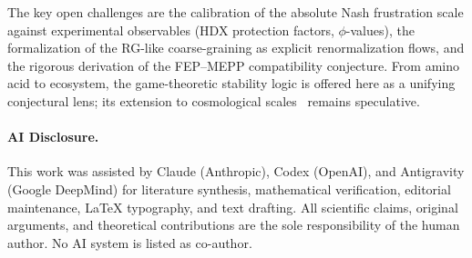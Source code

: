 \documentclass[12pt,a4paper]{article}
\theoremstyle{remark}
\begin{document}
The key open challenges are the calibration of the absolute Nash frustration scale against experimental observables (HDX protection factors, $\phi$-values), the formalization of the RG-like coarse-graining as explicit renormalization flows, and the rigorous derivation of the FEP--MEPP compatibility conjecture. From amino acid to ecosystem, the game-theoretic stability logic is offered here as a unifying conjectural lens; its extension to cosmological scales~\citep{FST-Unified2026} remains speculative.

\begingroup
\small
\paragraph*{AI Disclosure.} This work was assisted by Claude (Anthropic), Codex (OpenAI), and Antigravity (Google DeepMind) for literature synthesis, mathematical verification, editorial maintenance, LaTeX typography, and text drafting. All scientific claims, original arguments, and theoretical contributions are the sole responsibility of the human author. No AI system is listed as co-author.
\endgroup

\end{document}
